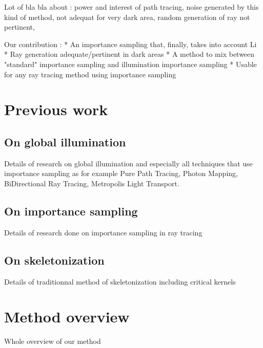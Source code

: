 Lot of bla bla about : 
power and interest of path tracing, 
noise generated by this kind of method,
not adequat for very dark area,
random generation of ray not pertinent,

Our contribution :
* An importance sampling that, finally, takes into account Li
* Ray generation adequate/pertinent in dark areas
* A method to mix between "standard" importance sampling and illumination importance sampling
* Usable for any ray tracing method using importance sampling

\section{Previous work}

\subsection{On global illumination}

Details of research on global illumination and especially all techniques that use importance sampling as for example Pure Path Tracing, Photon Mapping, BiDirectional Ray Tracing, Metropolis Light Transport.

\subsection{On importance sampling}

Details of research done on importance sampling in ray tracing

\subsection{On skeletonization}

Details of traditionnal method of skeletonization including critical kernels

\section{Method overview}

Whole overview of our method

